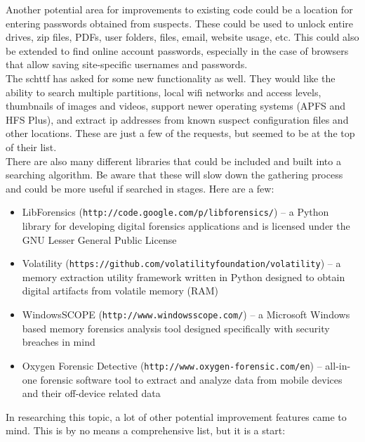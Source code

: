 \documentclass[12pt]{article}
\begin{document}
Another potential area for improvements to existing code could be a location for
entering passwords obtained from suspects.  These could be used to unlock entire
drives, zip files, PDFs, user folders, files, email, website usage, etc.  This
could also be extended to find online account passwords, especially in the case
of browsers that allow saving site-specific usernames and passwords.\\

The \gls{schttf} has asked for some new functionality as well.  They would like the
ability to search multiple partitions, local \gls{wifi} networks and access levels, 
thumbnails of images and videos, support newer operating systems (APFS and
HFS Plus), and extract \gls{ip} addresses from known suspect configuration files and 
other locations.  These are just a few of the requests, but seemed to be at
the top of their list.\\

There are also many different libraries that could be included and built
into a searching algorithm.  Be aware that these will slow down the gathering
process and could be more useful if searched in stages.  Here are a few:

\vspace{0.5 cm}
\begin{itemize}
  \item LibForensics ({\tt http://code.google.com/p/libforensics/}) --
  a Python library for developing digital forensics applications and
  is licensed under the GNU Lesser General Public License
  \item Volatility ({\tt https://github.com/volatilityfoundation/volatility}) --
  a memory extraction utility framework written in Python designed to
  obtain digital artifacts from volatile memory (RAM)
  \item WindowsSCOPE ({\tt http://www.windowsscope.com/}) -- 
  a Microsoft Windows\texttrademark\\
  based memory forensics analysis tool designed specifically with security breaches
  in mind
  \item Oxygen Forensic Detective ({\tt http://www.oxygen-forensic.com/en}) -- 
  all-in-one forensic software tool to extract and analyze data from mobile
  devices and their off-device related data
\end{itemize}
\vspace{0.5 cm}

In researching this topic, a lot of other potential improvement features
came to mind.  This is by no means a comprehensive list, but it is a start:
\end{document}
